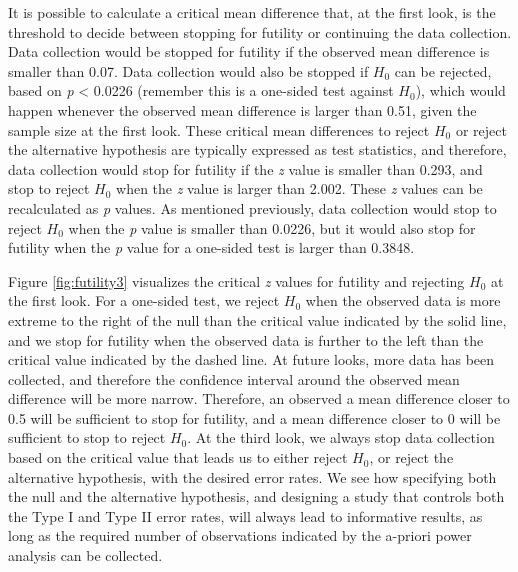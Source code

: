 \documentclass[
  english,
  ,jou, a4paper,floatsintext]{apa6}
\begin{document}
It is possible to calculate a critical mean difference that, at the first look, is the threshold to decide between stopping for futility or continuing the data collection. Data collection would be stopped for futility if the observed mean difference is smaller than 0.07. Data collection would also be stopped if \(H_0\) can be rejected, based on \emph{p} \textless{} 0.0226 (remember this is a one-sided test against \(H_0\)), which would happen whenever the observed mean difference is larger than 0.51, given the sample size at the first look. These critical mean differences to reject \(H_0\) or reject the alternative hypothesis are typically expressed as test statistics, and therefore, data collection would stop for futility if the \emph{z} value is smaller than 0.293, and stop to reject \(H_0\) when the \emph{z} value is larger than 2.002. These \emph{z} values can be recalculated as \emph{p} values. As mentioned previously, data collection would stop to reject \(H_0\) when the \emph{p} value is smaller than 0.0226, but it would also stop for futility when the \emph{p} value for a one-sided test is larger than 0.3848.

Figure \ref{fig:futility3} visualizes the critical \emph{z} values for futility and rejecting \(H_0\) at the first look. For a one-sided test, we reject \(H_0\) when the observed data is more extreme to the right of the null than the critical value indicated by the solid line, and we stop for futility when the observed data is further to the left than the critical value indicated by the dashed line. At future looks, more data has been collected, and therefore the confidence interval around the observed mean difference will be more narrow. Therefore, an observed a mean difference closer to 0.5 will be sufficient to stop for futility, and a mean difference closer to 0 will be sufficient to stop to reject \(H_0\). At the third look, we always stop data collection based on the critical value that leads us to either reject \(H_0\), or reject the alternative hypothesis, with the desired error rates. We see how specifying both the null and the alternative hypothesis, and designing a study that controls both the Type I and Type II error rates, will always lead to informative results, as long as the required number of observations indicated by the a-priori power analysis can be collected.
\end{document}
